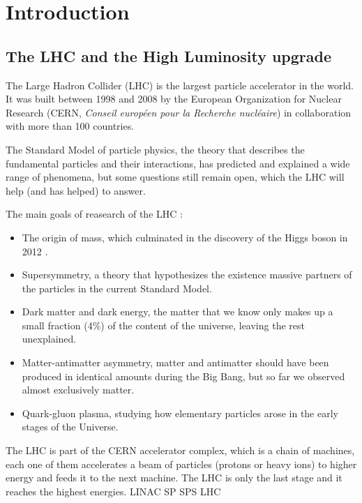 
\chapter{Introduction}

\section{The LHC and the High Luminosity upgrade}

The Large Hadron Collider (LHC) is the largest particle accelerator in the world. It was built between 1998 and 2008 by the European Organization for Nuclear Research (CERN, \textit{Conseil européen pour la Recherche nucléaire}) in collaboration with more than 100 countries.

The Standard Model of particle physics, the theory that describes the fundamental particles and their interactions, has predicted and explained a wide range of phenomena, but some questions still remain open, which the LHC will help (and has helped) to answer.

The main goals of reasearch of the LHC \cite{homeFactsFigures}:
\begin{itemize}
    \item The origin of mass, which culminated in the discovery of the Higgs boson in 2012 \cite{20121}. 
    \item Supersymmetry, a theory that hypothesizes the existence massive partners of the particles in the current Standard Model.
    \item Dark matter and dark energy, the matter that we know only makes up a small fraction (4\%) of the content of the universe, leaving the rest unexplained.
    \item Matter-antimatter asymmetry, matter and antimatter should have been produced in identical amounts during the Big Bang, but so far we observed almost exclusively matter.
    \item Quark-gluon plasma, studying how elementary particles arose in the early stages of the Universe.
\end{itemize}

The LHC is part of the CERN accelerator complex, which is a chain of machines, each one of them accelerates a beam of particles (protons or heavy ions) to higher energy and feeds it to the next machine. The LHC is only the last stage and it reaches the highest energies.
LINAC
SP
SPS
LHC

